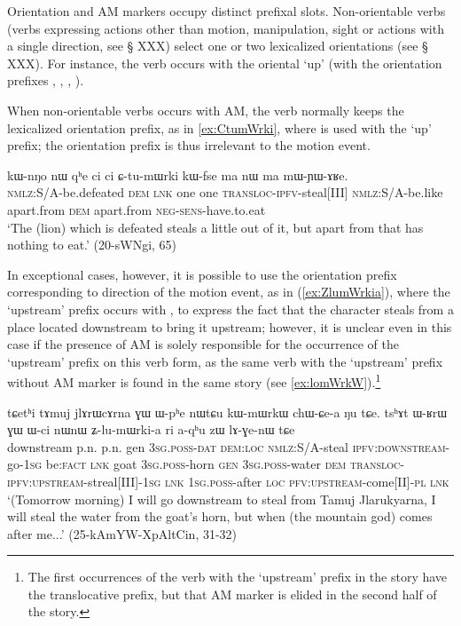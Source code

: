 Orientation and AM markers occupy distinct prefixal slots. Non-orientable verbs (verbs expressing actions other than motion, manipulation, sight or actions with a single direction, see § XXX) select one or two lexicalized orientations (see § XXX). For instance, the verb  occurs with the oriental `up' (with the orientation prefixes , , , ). 

When non-orientable verbs occurs with AM, the verb normally keeps the lexicalized orientation prefix, as in \ref{ex:CtumWrki}, where  is used with the  `up' prefix; the orientation prefix is thus irrelevant to the motion event. 

\begin{exe}
\ex \label{ex:CtumWrki}
 \gll kɯ-nŋo nɯ qʰe ci ci ɕ-tu-mɯrki kɯ-fse ma nɯ ma mɯ-ɲɯ-ɤʁe. \\
\textsc{nmlz}:S/A-be.defeated \textsc{dem} \textsc{lnk} one one \textsc{transloc}-\textsc{ipfv}-steal[III] \textsc{nmlz}:S/A-be.like apart.from \textsc{dem} apart.from \textsc{neg}-\textsc{sens}-have.to.eat \\
\glt `The (lion) which is defeated steals a little out of it, but apart from that has nothing to eat.' (20-sWNgi, 65)
\end{exe}

In exceptional cases, however, it is possible to use the orientation prefix corresponding to direction of the motion event, as in (\ref{ex:ZlumWrkia}), where the `upstream' prefix occurs with , to express the fact that the character steals from a place located downstream to bring it upstream; however, it is unclear even in this case if the presence of AM is solely responsible for the occurrence of the `upstream' prefix on this verb form, as the same verb with the `upstream' prefix  without AM marker is found in the same story (see \ref{ex:lomWrkW}).\footnote{The first occurrences of the verb  with the  `upstream' prefix in the story have the translocative prefix, but that AM marker is elided in the second half of the story.  }

\begin{exe}
\ex \label{ex:ZlumWrkia}
 \gll tɕetʰi tɤmuj jlɤrɯcɤrna ɣɯ ɯ-pʰe nɯtɕu kɯ-mɯrkɯ chɯ-ɕe-a ŋu tɕe. tsʰɤt ɯ-ʁrɯ ɣɯ ɯ-ci nɯnɯ ʑ-lu-mɯrki-a ri a-qʰu zɯ lɤ-ɣe-nɯ tɕe \\
 downstream p.n. p.n. gen \textsc{3sg}.\textsc{poss}-\textsc{dat} \textsc{dem}:\textsc{loc}  \textsc{nmlz}:S/A-steal  \textsc{ipfv}:\textsc{downstream}-go-\textsc{1sg} be:\textsc{fact} \textsc{lnk}  goat \textsc{3sg}.\textsc{poss}-horn \textsc{gen} \textsc{3sg}.\textsc{poss}-water \textsc{dem} \textsc{transloc}-\textsc{ipfv}:\textsc{upstream}-streal[III]-\textsc{1sg} \textsc{lnk} \textsc{1sg}.\textsc{poss}-after \textsc{loc} \textsc{pfv}:\textsc{upstream}-come[II]-\textsc{pl} \textsc{lnk}  \\
 \glt `(Tomorrow  morning) I will go downstream to steal from Tamuj Jlarukyarna, I will steal the water from the goat's horn, but when (the mountain god) comes after me...' (25-kAmYW-XpAltCin, 31-32)
\end{exe}


